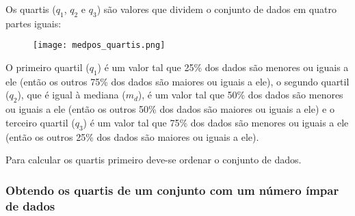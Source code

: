 \documentclass[11pt,fleqn]{book} %
\begin{document}
Os quartis ($q_1$, $q_2$ e $q_3$) são valores que dividem o conjunto de dados em quatro partes iguais:


\begin{figure}[h!]
\centering\texttt{[image: medpos\_quartis.png]}
\label{fig:medpos_quartis} %
\end{figure}

\vspace{0,3cm}

O primeiro quartil ($q_1$) é um valor tal que 25\% dos dados são menores ou iguais a ele (então os outros 75\% dos dados são maiores ou iguais a ele), o segundo quartil ($q_2$), que é igual à mediana ($m_d$), é um valor tal que 50\% dos dados são menores ou iguais a ele (então os outros 50\% dos dados são maiores ou iguais a ele) e o terceiro quartil ($q_3$) é um valor tal que 75\% dos dados são menores ou iguais a ele (então os outros 25\% dos dados são maiores ou iguais a ele). 

Para calcular os quartis primeiro deve-se ordenar o conjunto de dados. \\


\subsubsection{Obtendo os quartis de um conjunto com um número ímpar de dados}
\vspace{0,3cm}
\end{document}
